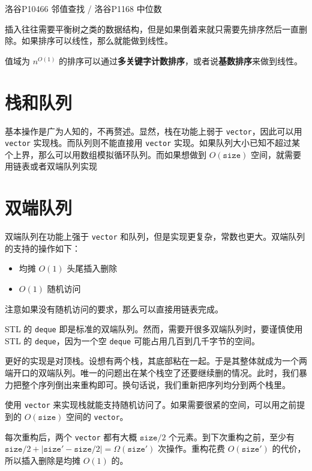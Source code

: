     \begin{example}
        洛谷P10466 邻值查找 / 洛谷P1168 中位数
    \end{example}

    插入往往需要平衡树之类的数据结构，但是如果倒着来就只需要先排序然后一直删除。如果排序可以线性，那么就能做到线性。

\begin{remark}
    值域为 $n^{O(1)}$ 的排序可以通过\textbf{多关键字计数排序}，或者说\textbf{基数排序}来做到线性。
\end{remark}

\section{栈和队列}
    基本操作是广为人知的，不再赘述。显然，栈在功能上弱于 \texttt{vector}，因此可以用 \texttt{vector} 实现栈。而队列则不能直接用 \texttt{vector} 实现。如果队列大小已知不超过某个上界，那么可以用数组模拟循环队列。而如果想做到 $O(\mathtt{size})$ 空间，就需要用链表或者双端队列实现

\section{双端队列}
    双端队列在功能上强于 \texttt{vector} 和队列，但是实现更复杂，常数也更大。双端队列的支持的操作如下：
    \begin{itemize}
        \item 均摊 $O(1)$ 头尾插入删除
        \item $O(1)$ 随机访问
    \end{itemize}
    注意如果没有随机访问的要求，那么可以直接用链表完成。

    STL 的 \texttt{deque} 即是标准的双端队列。然而，需要开很多双端队列时，要谨慎使用 STL 的 \texttt{deque}，因为一个空 \texttt{deque} 可能占用几百到几千字节的空间。 

    更好的实现是对顶栈。设想有两个栈，其底部粘在一起。于是其整体就成为一个两端开口的双端队列。唯一的问题出在某个栈空了还要继续删的情况。此时，我们暴力把整个序列倒出来重构即可。换句话说，我们重新把序列均分到两个栈里。

    使用 \texttt{vector} 来实现栈就能支持随机访问了。如果需要很紧的空间，可以用之前提到的 $O(\mathtt{size})$ 空间的 \texttt{vector}。
    
    每次重构后，两个 \texttt{vector} 都有大概 $\mathtt{size}/2$ 个元素。到下次重构之前，至少有 $\mathtt{size}/2+|\mathtt{size}'-\mathtt{size}/2|=\Omega(\mathtt{size}')$ 次操作。重构花费 $O(\mathtt{size}')$ 的代价，所以插入删除是均摊 $O(1)$ 的。

